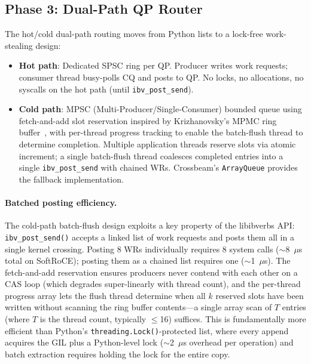 \documentclass[11pt,letterpaper]{article}
\begin{document}
\subsection{Phase 3: Dual-Path QP Router}

The hot/cold dual-path routing moves from Python lists to a lock-free work-stealing design:

\begin{itemize}
    \item \textbf{Hot path}: Dedicated SPSC ring per QP. Producer writes work requests; consumer thread busy-polls CQ and posts to QP. No locks, no allocations, no syscalls on the hot path (until \texttt{ibv\_post\_send}).

    \item \textbf{Cold path}: MPSC (Multi-Producer/Single-Consumer) bounded queue using fetch-and-add slot reservation inspired by Krizhanovsky's MPMC ring buffer~\cite{krizhanovsky-mpmc}, with per-thread progress tracking to enable the batch-flush thread to determine completion. Multiple application threads reserve slots via atomic increment; a single batch-flush thread coalesces completed entries into a single \texttt{ibv\_post\_send} with chained WRs. Crossbeam's \texttt{ArrayQueue} provides the fallback implementation.
\end{itemize}

\paragraph{Batched posting efficiency.}
The cold-path batch-flush design exploits a key property of the libibverbs API: \texttt{ibv\_post\_send()} accepts a linked list of work requests and posts them all in a single kernel crossing. Posting 8 WRs individually requires 8 system calls (${\sim}$8~$\mu$s total on SoftRoCE); posting them as a chained list requires one (${\sim}$1~$\mu$s). The fetch-and-add reservation ensures producers never contend with each other on a CAS loop (which degrades super-linearly with thread count), and the per-thread progress array lets the flush thread determine when all $k$ reserved slots have been written without scanning the ring buffer contents---a single array scan of $T$ entries (where $T$ is the thread count, typically $\leq$16) suffices. This is fundamentally more efficient than Python's \texttt{threading.Lock()}-protected list, where every append acquires the GIL plus a Python-level lock (${\sim}$2~$\mu$s overhead per operation) and batch extraction requires holding the lock for the entire copy.
\end{document}
